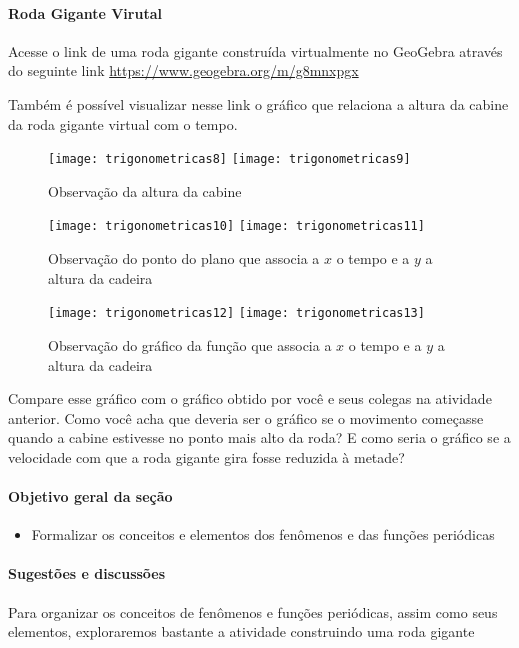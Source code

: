 \begin{reflection}
\label{trig-reflection1}
\vspace{-2\parskip}
\paragraph{Roda Gigante Virutal}

Acesse o link de uma roda gigante construída virtualmente no GeoGebra através do seguinte link \url{https://www.geogebra.org/m/g8mnxpgx}

Também é possível visualizar nesse link o gráfico que relaciona a altura da cabine da roda gigante virtual com o tempo.

\begin{figure}[H]
\centering

\texttt{[image: trigonometricas8]}
\texttt{[image: trigonometricas9]}
\caption{Observação da altura da cabine}

\end{figure}

\begin{figure}[H]
\centering

\texttt{[image: trigonometricas10]}
\texttt{[image: trigonometricas11]}
\caption{Observação do ponto do plano que associa a $x$ o tempo e a $y$ a altura da cadeira}
\end{figure}

\begin{figure}[H]
\centering

\texttt{[image: trigonometricas12]}
\texttt{[image: trigonometricas13]}
\caption{Observação do gráfico da função que associa a $x$ o tempo e a $y$ a altura da cadeira}
\end{figure}

Compare esse gráfico com o gráfico obtido por você e seus colegas na atividade anterior. Como você acha que deveria ser o gráfico se o movimento começasse quando a cabine estivesse no ponto mais alto da roda? E como seria o gráfico se a velocidade com que a roda gigante gira fosse reduzida à metade?
\end{reflection}

\clearpage
\begin{texto}
{	\def\currentcolor{session4}
	\paragraph{Objetivo geral da seção}
	\begin{itemize}
	\item Formalizar os conceitos e elementos dos fenômenos e das
	funções periódicas
	\end{itemize}

	\paragraph{Sugestões e discussões}

	Para organizar os conceitos de fenômenos e
	funções periódicas, assim como seus elementos,
	exploraremos bastante a atividade construindo uma roda
	gigante

}
\end{texto}
\label{trig-arg1}

